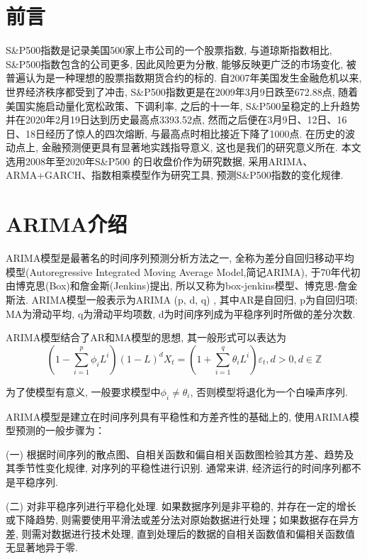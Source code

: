 \documentclass[12pt]{article}
\begin{document}
% 
\tableofcontents


\newpage
\section{前言}
\qquad S\&P500指数是记录美国500家上市公司的一个股票指数, 与道琼斯指数相比, S\&P500指数包含的公司更多, 因此风险更为分散, 能够反映更广泛的市场变化, 被普遍认为是一种理想的股票指数期货合约的标的. 自2007年美国发生金融危机以来, 世界经济秩序都受到了冲击, S\&P500指数更是在2009年3月9日跌至672.88点, 随着美国实施启动量化宽松政策、下调利率, 之后的十一年, S\&P500呈稳定的上升趋势并在2020年2月19日达到历史最高点3393.52点, 然而之后便在3月9日、12日、16日、18日经历了惊人的四次熔断, 与最高点时相比接近下降了1000点. 在历史的波动点上, 金融预测便更具有显著地实践指导意义, 这也是我们的研究意义所在. 本文选用2008年至2020年S\&P500 的日收盘价作为研究数据, 采用ARIMA、ARMA+GARCH、指数相乘模型作为研究工具, 预测S\&P500指数的变化规律. 

\section{ARIMA介绍}

\qquad ARIMA模型是最著名的时间序列预测分析方法之一, 全称为差分自回归移动平均模型(Autoregressive Integrated Moving Average Model,简记ARIMA), 于70年代初由博克思(Box)和詹金斯(Jenkins)提出, 所以又称为box-jenkins模型、博克思-詹金斯法. ARIMA模型一般表示为ARIMA (p, d, q) , 其中AR是自回归, p为自回归项; MA为滑动平均, q为滑动平均项数, d为时间序列成为平稳序列时所做的差分次数. 

\qquad ARIMA模型结合了AR和MA模型的思想, 其一般形式可以表达为
\[
(1-\sum_{i=1}^p \phi_i L^i)(1-L)^d X_t = (1+\sum_{i=1}^q \theta_i L^i)\varepsilon_t,d>0,d \in \mathbb{Z}
\]

为了使模型有意义, 一般要求模型中$\phi_i \ne \theta_i$, 否则模型将退化为一个白噪声序列. 

\qquad ARIMA模型是建立在时间序列具有平稳性和方差齐性的基础上的, 使用ARIMA模型预测的一般步骤为：

\qquad  (一) 根据时间序列的散点图、自相关函数和偏自相关函数图检验其方差、趋势及其季节性变化规律, 对序列的平稳性进行识别. 通常来讲,  经济运行的时间序列都不是平稳序列. 

\qquad  (二) 对非平稳序列进行平稳化处理. 如果数据序列是非平稳的, 并存在一定的增长或下降趋势, 则需要使用平滑法或差分法对原始数据进行处理；如果数据存在异方差, 则需对数据进行技术处理, 直到处理后的数据的自相关函数值和偏相关函数值无显著地异于零. 
\end{document}
